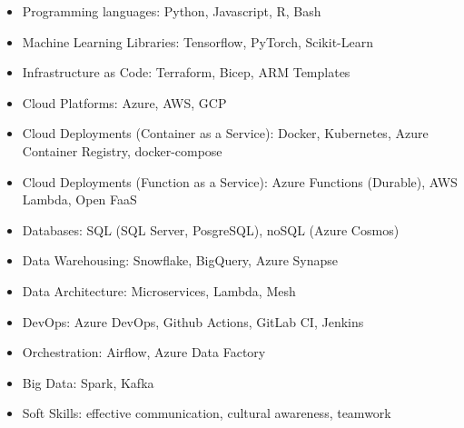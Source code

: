 \documentclass[a4paper, 12]{scrartcl}
\newcommand{\preSectionSpace}{\vspace{4pt}}
\newcommand{\composedCvSection}[1]{\preSectionSpace{\large\textcolor{black}{#1}}}
\begin{document}
            \parbox{1.0\linewidth}{
                \composedCvSection{Skills}
                
                \parbox{0.49\linewidth}{
		          \begin{flushleft}
                        \begin{itemize}
                            \item Programming languages: Python, Javascript, R, Bash
                            \item Machine Learning Libraries: Tensorflow, PyTorch, Scikit-Learn
                            \item Infrastructure as Code: Terraform, Bicep, ARM Templates
                            \item Cloud Platforms: Azure, AWS, GCP
                            \item Cloud Deployments (Container as a Service): Docker, Kubernetes, Azure Container Registry, docker-compose
                            \item Cloud Deployments (Function as a Service): Azure Functions (Durable), AWS Lambda, Open FaaS
                        \end{itemize}
	       	   \end{flushleft}
                }
                \parbox{0.49\linewidth}{
                     \begin{flushleft}
                        \begin{itemize}
                            \item Databases: SQL (SQL Server, PosgreSQL), noSQL (Azure Cosmos)
        				\item Data Warehousing: Snowflake, BigQuery, Azure Synapse
        				\item Data Architecture: Microservices, Lambda, Mesh
                            \item DevOps: Azure DevOps, Github Actions, GitLab CI, Jenkins
                            \item Orchestration: Airflow, Azure Data Factory
                            \item Big Data: Spark, Kafka
                            \item Soft Skills: effective communication, cultural awareness, teamwork
                        \end{itemize}
	       	   \end{flushleft}
                }
            }
            
\end{document}
